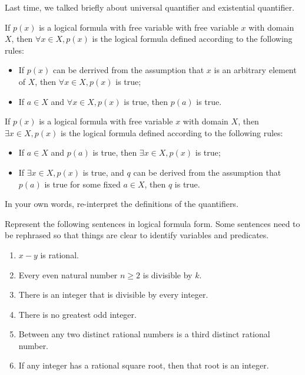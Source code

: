 \documentclass[12pt]{amsart}
\begin{document}
Last time, we talked briefly about universal quantifier and existential quantifier.

\begin{definition}
    If $p(x)$ is a logical formula with free variable with free variable $x$ with domain $X$,
    then $\forall x\in X, p(x)$ is the logical formula defined according to the following rules:
    \begin{itemize}
        \item If $p(x)$ can be derrived from the assumption that $x$ is an arbitrary element of $X$,
            then $\forall x\in X, p(x)$ is true;
        \item If $a\in X$ and  $\forall x \in X, p(x)$ is true, then $p(a)$ is true.
    \end{itemize}
\end{definition}

\begin{definition}
    If $p(x)$ is a logical formula with free variable $x$ with domain $X$, then 
    $\exists x\in X, p(x)$ is the logical formula defined according to the following rules:
    \begin{itemize}
        \item If $a\in X$ and $p(a)$ is true, then $\exists x \in X, p(x)$ is true;
        \item If $\exists x\in X, p(x)$ is true, and $q$ can be derived from the assumption
            that $p(a)$ is true for some fixed $a \in X$, then $q$ is true.
    \end{itemize}
\end{definition}


\begin{problem}
    In your own words, re-interpret the definitions of the quantifiers.
\end{problem}





\begin{problem}
    Represent the following sentences in logical formula form. 
    Some sentences need to be rephrased so that things are clear to identify variables and predicates.
    \begin{enumerate}
        \item $x-y$ is rational.
        \item Every even natural number $n\geq 2$ is divisible by $k$.
        \item There is an integer that is divisible by every integer.
        \item There is no greatest odd integer.
        \item Between any two distinct rational numbers is a third distinct rational number.
        \item If any integer has a rational square root, then that root is an integer.
    \end{enumerate}
\end{problem}
\end{document}
